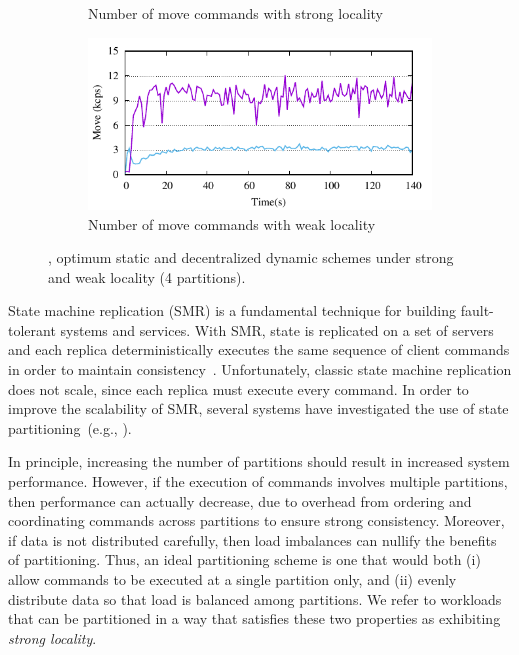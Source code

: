 \begin{figure}[ht!]
\begin{subfigure}[b]{0.45\textwidth}
  \caption{Number of move commands with strong locality}
  \end{subfigure}
  \begin{subfigure}[b]{0.45\textwidth}
    \centering
    \includegraphics[width=0.95\columnwidth]{figures/experiments/dynastar-vs-dssmr-4p-5-move}
    \caption{Number of move commands with weak locality}
  \end{subfigure}
  \caption{\dynastar, optimum static and decentralized dynamic schemes under strong and weak locality (4 partitions).}
  \label{fig:motivation}
\end{figure}




State machine replication (SMR) is a fundamental technique for
building fault-tolerant systems and services. With SMR, state is
replicated on a set of servers and each replica deterministically
executes the same sequence of client commands in order to maintain
consistency~\cite{Lam78,Sch90}. Unfortunately, classic state machine replication does not
scale, since each replica must execute every command. In order to
improve the scalability of SMR, several systems have investigated the
use of state partitioning~(e.g., \cite{corbett2013spanner, bezerra2014ssmr,Glendenning:2011kj,
  Aguilera:2007,bli16edcc}).

In principle, increasing the number of partitions should result in
increased system performance. However, if the execution of commands involves
multiple partitions, then performance can
actually decrease, due to overhead from ordering and coordinating
commands across partitions to ensure strong consistency. Moreover, if
data is not distributed carefully, then load imbalances can nullify
the benefits of partitioning. Thus, an ideal partitioning scheme is
one that would both (i) allow commands to be executed at a single
partition only, and (ii) evenly distribute data so that load is
balanced among partitions.  We refer to workloads that can be
partitioned in a way that satisfies these two properties as exhibiting
\emph{strong locality}.

